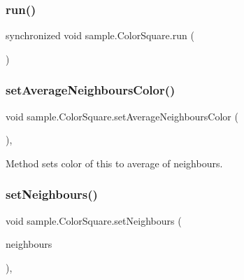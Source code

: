\subsubsection{\texorpdfstring{run()}{run()}}
{\footnotesize\ttfamily synchronized void sample.\+Color\+Square.\+run (\begin{DoxyParamCaption}{ }\end{DoxyParamCaption})\hspace{0.3cm}{\ttfamily [inline]}}

\mbox{\label{classsample_1_1_color_square_a47856df2afb0e0dcdf11dfe5801570c9}} 
\subsubsection{\texorpdfstring{set\+Average\+Neighbours\+Color()}{setAverageNeighboursColor()}}
{\footnotesize\ttfamily void sample.\+Color\+Square.\+set\+Average\+Neighbours\+Color (\begin{DoxyParamCaption}{ }\end{DoxyParamCaption})\hspace{0.3cm}{\ttfamily [inline]}, {\ttfamily [private]}}

Method sets color of this to average of neighbours. \mbox{\label{classsample_1_1_color_square_a8bc5e469f5dc2dd0a9a1963112b77fee}} 
\subsubsection{\texorpdfstring{set\+Neighbours()}{setNeighbours()}}
{\footnotesize\ttfamily void sample.\+Color\+Square.\+set\+Neighbours (\begin{DoxyParamCaption}\item[{\mbox{\hyperlink{classsample_1_1_color_square}{Color\+Square}} \mbox{[}$\,$\mbox{]}}]{neighbours }\end{DoxyParamCaption})\hspace{0.3cm}{\ttfamily [inline]}, {\ttfamily [package]}}

